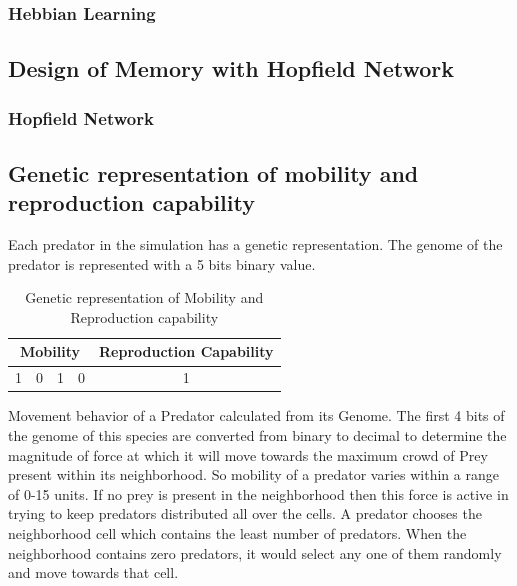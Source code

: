 \subsubsection{Hebbian Learning}

\subsection{Design of Memory with Hopfield Network}

\subsubsection{Hopfield Network}

\subsection{Genetic representation of mobility and reproduction capability}
Each predator in the simulation has a genetic representation. The genome of the predator is represented with a 5 bits binary value. 

\begin{table}[H]
	\centering
	\begin{tabular}{|c|c|c|c|c|}
		\hline
			\multicolumn{4}{|c|}{Mobility} &	Reproduction Capability \\ \hline
			1	& 0 &	1	& 0 								&	1\\
		\hline
	\end{tabular}
	\caption{Genetic representation of Mobility and Reproduction capability}
	\label{tab:genetic-representation-mobility-reproduction}
\end{table}

Movement behavior of a Predator calculated from its Genome. The first 4 bits of the genome of this species are converted from binary to decimal to determine the magnitude of force at which it will move towards the maximum crowd of Prey present within its neighborhood. So mobility of a predator varies within a range of 0-15 units. If no prey is present in the neighborhood then this force is active in trying to keep predators distributed all over the cells. A predator chooses the neighborhood cell which contains the least number of predators. When the neighborhood contains zero predators, it would select any one of them randomly and move towards that cell.

